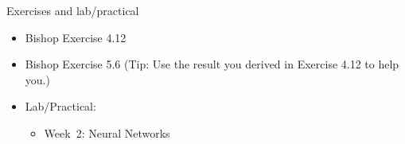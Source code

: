 \documentclass[10pt]{beamer}
\begin{document}
\begin{titledslide}{Exercises and lab/practical}

  \begin{itemize}
  \item Bishop Exercise 4.12
  \item Bishop Exercise 5.6 (Tip: Use the result you derived in
    Exercise 4.12 to help you.) 
  \item Lab/Practical:
    \begin{itemize}
    \item Week~2: Neural Networks
    \end{itemize}
  \end{itemize}
  
\end{titledslide}
\end{document}
